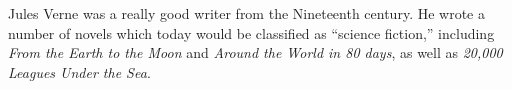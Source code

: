 \begin{vita}
Jules Verne was a really good writer from the Nineteenth century.  He wrote a number of
novels which today would be classified as ``science fiction,'' including \textit{From the
Earth to the Moon} and \textit{Around the World in 80 days}, as well as \textit{20,000 
Leagues Under the Sea}.
\end{vita}
